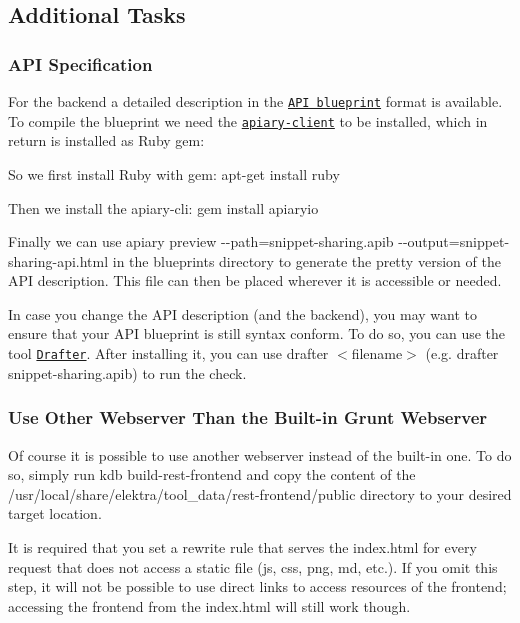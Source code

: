 \subsection*{Additional Tasks}

\subsubsection*{A\+PI Specification}

For the backend a detailed description in the \href{https://apiblueprint.org/}{\tt A\+PI blueprint} format is available. To compile the blueprint we need the \href{https://github.com/apiaryio/apiary-client}{\tt apiary-\/client} to be installed, which in return is installed as Ruby gem\+:


\begin{DoxyItemize}
\item So we first install Ruby with gem\+: {\ttfamily apt-\/get install ruby}
\item Then we install the apiary-\/cli\+: {\ttfamily gem install apiaryio}
\item Finally we can use {\ttfamily apiary preview -\/-\/path=snippet-\/sharing.\+apib -\/-\/output=snippet-\/sharing-\/api.\+html} in the blueprints directory to generate the pretty version of the A\+PI description. This file can then be placed wherever it is accessible or needed.
\end{DoxyItemize}

In case you change the A\+PI description (and the backend), you may want to ensure that your A\+PI blueprint is still syntax conform. To do so, you can use the tool \href{https://github.com/apiaryio/drafter}{\tt Drafter}. After installing it, you can use {\ttfamily drafter $<$filename$>$} (e.\+g. {\ttfamily drafter snippet-\/sharing.\+apib}) to run the check.

\subsubsection*{Use Other Webserver Than the Built-\/in Grunt Webserver}

Of course it is possible to use another webserver instead of the built-\/in one. To do so, simply run {\ttfamily kdb build-\/rest-\/frontend} and copy the content of the {\ttfamily /usr/local/share/elektra/tool\+\_\+data/rest-\/frontend/public} directory to your desired target location.

It is required that you set a rewrite rule that serves the {\ttfamily index.\+html} for every request that does not access a static file ({\ttfamily js}, {\ttfamily css}, {\ttfamily png}, {\ttfamily md}, etc.). If you omit this step, it will not be possible to use direct links to access resources of the frontend; accessing the frontend from the {\ttfamily index.\+html} will still work though.

